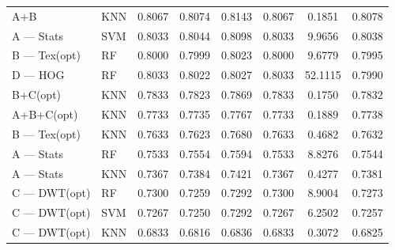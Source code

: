 \documentclass[12pt,a4paper]{article}
\begin{document}
\begin{table}[ht]
{\begin{tabular}{l l c c c c c c}
    A+B & KNN & 0.8067 & 0.8074 & 0.8143 & 0.8067 & 0.1851 & 0.8078 \\
    A — Stats & SVM & 0.8033 & 0.8044 & 0.8098 & 0.8033 & 9.9656 & 0.8038 \\
    B — Tex(opt) & RF & 0.8000 & 0.7999 & 0.8023 & 0.8000 & 9.6779 & 0.7995 \\
    D — HOG & RF & 0.8033 & 0.8022 & 0.8027 & 0.8033 & 52.1115 & 0.7990 \\
    B+C(opt) & KNN & 0.7833 & 0.7823 & 0.7869 & 0.7833 & 0.1750 & 0.7832 \\
    A+B+C(opt) & KNN & 0.7733 & 0.7735 & 0.7767 & 0.7733 & 0.1889 & 0.7738 \\
    B — Tex(opt) & KNN & 0.7633 & 0.7623 & 0.7680 & 0.7633 & 0.4682 & 0.7632 \\
    A — Stats & RF & 0.7533 & 0.7554 & 0.7594 & 0.7533 & 8.8276 & 0.7544 \\
    A — Stats & KNN & 0.7367 & 0.7384 & 0.7421 & 0.7367 & 0.4277 & 0.7381 \\
    C — DWT(opt) & RF & 0.7300 & 0.7259 & 0.7292 & 0.7300 & 8.9004 & 0.7273 \\
    C — DWT(opt) & SVM & 0.7267 & 0.7250 & 0.7292 & 0.7267 & 6.2502 & 0.7257 \\
    C — DWT(opt) & KNN & 0.6833 & 0.6816 & 0.6836 & 0.6833 & 0.3072 & 0.6825 \\
    \bottomrule
    \end{tabular}%
    }
    \end{table}
\end{document}
